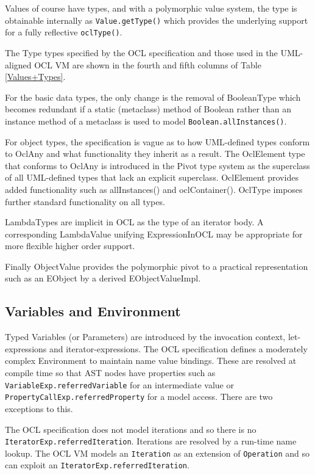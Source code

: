 \documentclass{sig-alternate}
\begin{document}
Values of course have types, and with a polymorphic value system, the type is obtainable internally as \verb|Value.getType()| which provides the underlying support for a fully reflective  \verb|oclType()|.

The Type types specified by the OCL specification and those used in the UML-aligned OCL VM\cite{OCL-UML} are shown in the fourth and fifth columns of Table \ref{Values+Types}.

For the basic data types, the only change is the removal of BooleanType which becomes redundant if a static (metaclass) method of Boolean rather than an instance method of a metaclass is used to model \verb|Boolean.allInstances()|.

For object types, the specification is vague as to how UML-defined types conform to OclAny and what functionality they inherit as a result. The OclElement type that conforms to OclAny is introduced in the Pivot type system as the superclass of all UML-defined types that lack an explicit superclass. OclElement provides added functionality such as allInstances() and oclContainer(). OclType imposes further standard functionality on all types.

LambdaTypes are implicit in OCL as the type of an iterator body\cite{OCL-stdlib}. A corresponding LambdaValue unifying ExpressionInOCL may be appropriate for more flexible higher order support.

Finally ObjectValue provides the polymorphic pivot to a practical representation such as an EObject by a derived EObjectValueImpl. 

\subsection{Variables and Environment}

Typed Variables (or Parameters) are introduced by the invocation context, let-expressions and iterator-expressions. The OCL specification defines a moderately complex Environment to maintain name value bindings. These are resolved at compile time
so that AST nodes have properties such as \verb|VariableExp.referredVariable| for an intermediate value or \verb|PropertyCallExp.referredProperty| for a model access. There are two exceptions to this.

The OCL specification does not model iterations and so there is no  \verb|IteratorExp.referredIteration|. Iterations are resolved by a run-time name lookup. The OCL VM models an \verb|Iteration| as an extension of \verb|Operation| and so can exploit an \verb|IteratorExp.referredIteration|\cite{OCL-UML}.
\end{document}
